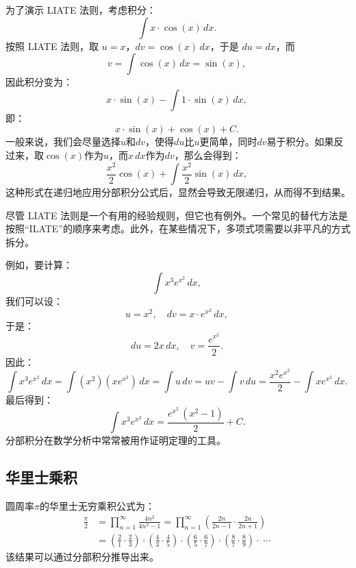 为了演示 LIATE 法则，考虑积分：
$$
\int x \cdot \cos(x)\,dx.~
$$
按照 LIATE 法则，取 $u = x$，$dv = \cos(x)\,dx$，于是 $du = dx$，而
$$
v = \int \cos(x)\,dx = \sin(x),~
$$
因此积分变为：
$$
x \cdot \sin(x) - \int 1 \cdot \sin(x)\,dx,~
$$
即：
$$
x \cdot \sin(x) + \cos(x) + C.~
$$
一般来说，我们会尽量选择$u$和$dv$，使得$du$比$u$更简单，同时$dv$易于积分。如果反过来，取$\cos(x)$作为$u$，而$x\,dx$作为$dv$，那么会得到：
$$
\frac{x^{2}}{2}\cos(x) + \int \frac{x^{2}}{2}\sin(x)\,dx,~
$$
这种形式在递归地应用分部积分公式后，显然会导致无限递归，从而得不到结果。

尽管 LIATE 法则是一个有用的经验规则，但它也有例外。一个常见的替代方法是按照“ILATE”的顺序来考虑。此外，在某些情况下，多项式项需要以非平凡的方式拆分。

例如，要计算：
$$
\int x^{3}e^{x^{2}}\,dx,~
$$
我们可以设：
$$
u = x^{2}, \quad dv = x \cdot e^{x^{2}}\,dx,~
$$
于是：
$$
du = 2x\,dx, \quad v = \frac{e^{x^{2}}}{2}.~
$$
因此：
$$
\int x^{3}e^{x^{2}}\,dx 
= \int (x^{2})(x e^{x^{2}})\,dx
= \int u\,dv
= uv - \int v\,du
= \frac{x^{2}e^{x^{2}}}{2} - \int xe^{x^{2}}\,dx.~
$$
最后得到：
$$
\int x^{3}e^{x^{2}}\,dx = \frac{e^{x^{2}}\,(x^{2}-1)}{2} + C.~
$$
分部积分在数学分析中常常被用作证明定理的工具。
\subsection{华里士乘积}
圆周率$\pi$的华里士无穷乘积公式为：
$$
\begin{aligned}
\frac{\pi}{2} 
&= \prod_{n=1}^{\infty} \frac{4n^{2}}{4n^{2}-1} 
= \prod_{n=1}^{\infty} \left(\frac{2n}{2n-1} \cdot \frac{2n}{2n+1}\right)\\
&= \left(\frac{2}{1}\cdot\frac{2}{3}\right)\cdot\left(\frac{4}{3}\cdot\frac{4}{5}\right)\cdot\left(\frac{6}{5}\cdot\frac{6}{7}\right)\cdot\left(\frac{8}{7}\cdot\frac{8}{9}\right)\cdot\;\cdots
\end{aligned}~
$$
该结果可以通过分部积分推导出来。
